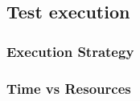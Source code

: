 \subsection{Test execution}\label{subsec:test-execution}

\subsubsection{Execution Strategy}

\subsubsection{Time vs Resources}
